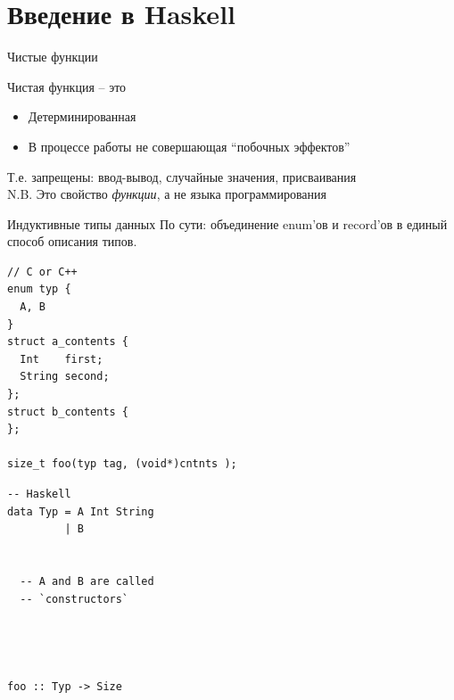 \documentclass[aspectratio=169
  , xcolor={svgnames}
  , hyperref=
      { colorlinks
      , urlcolor=DarkBlue 
      }  
  , russian  %
  ]{beamer}
\theoremstyle{exerciseStyle1}
\begin{document}
\section{Введение в Haskell}

\begin{frame}[fragile]{Чистые функции}
\begin{definition}{Чистая функция -- это}
  \begin{itemize}
    \item Детерминированная
    \item В процессе работы не совершающая ``побочных эффектов''
  \end{itemize}
\end{definition}
Т.е. запрещены: ввод-вывод, случайные значения, присваивания\\

N.B. Это свойство \emph{функции}, а не языка программирования

\end{frame}


\begin{frame}[fragile]{Индуктивные типы данных}
По сути: объединение enum'ов и  record'ов в единый способ описания типов.\\

\begin{minipage}{.58\textwidth}
\begin{verbatim}
// C or C++
enum typ {
  A, B
}
struct a_contents {
  Int    first;
  String second;
};
struct b_contents {
};

size_t foo(typ tag, (void*)cntnts );
\end{verbatim}
\end{minipage}
\begin{minipage}{.38\textwidth}
\begin{verbatim}
-- Haskell
data Typ = A Int String
         | B
         
         
  -- A and B are called 
  -- `constructors` 
         
         
         
         
foo :: Typ -> Size         
\end{verbatim}
\end{minipage}
\end{frame}
\end{document}
